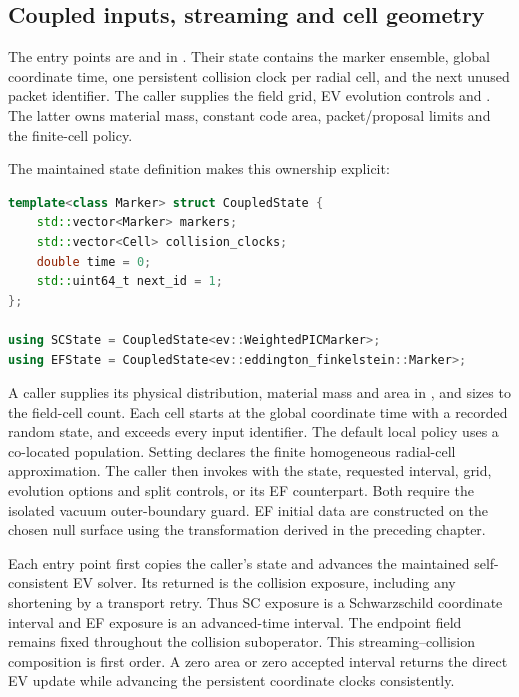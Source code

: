\subsection{Coupled inputs, streaming and cell geometry}

The entry points are  and  in
.
Their state contains the marker ensemble, global coordinate time, one
persistent collision clock per radial cell, and the next unused packet
identifier. The caller supplies the field grid, EV evolution controls and
. The latter owns material mass, constant code
area, packet/proposal limits and the finite-cell policy.

The maintained state definition makes this ownership explicit:
\par\medskip\noindent
\begin{minipage}{\linewidth}
\begin{lstlisting}[language=C++,showstringspaces=false]
template<class Marker> struct CoupledState {
    std::vector<Marker> markers;
    std::vector<Cell> collision_clocks;
    double time = 0;
    std::uint64_t next_id = 1;
};

using SCState = CoupledState<ev::WeightedPICMarker>;
using EFState = CoupledState<ev::eddington_finkelstein::Marker>;
\end{lstlisting}
\end{minipage}

A caller supplies its physical distribution, material mass and area in
, and sizes  to the field-cell
count. Each cell starts at the global coordinate time with a recorded random
state, and  exceeds every input identifier. The default local
policy uses a co-located population. Setting
 declares the finite homogeneous
radial-cell approximation. The caller then invokes
 with the state, requested interval, grid, evolution
options and split controls, or its EF counterpart.
Both require the isolated vacuum outer-boundary guard. EF initial data are
constructed on the chosen null surface using the transformation derived in
the preceding chapter.

Each entry point first copies the caller's state and advances the
maintained self-consistent EV solver. Its returned 
is the collision exposure, including any shortening by a transport retry.
Thus SC exposure is a Schwarzschild coordinate interval and EF exposure
is an advanced-time interval. The endpoint field remains fixed throughout
the collision suboperator. This streaming--collision composition is
first order. A zero area or zero accepted interval returns the direct EV
update while advancing the persistent coordinate clocks consistently.

